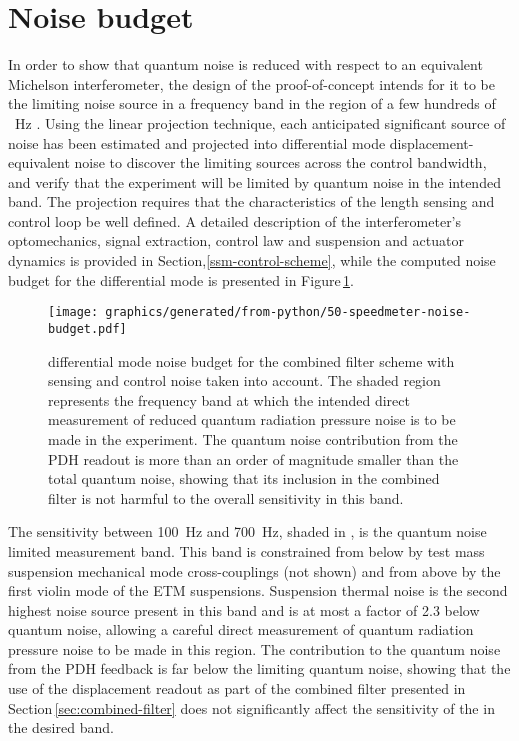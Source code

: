 \section{\label{sec:noise-budget}Noise budget}

In order to show that quantum noise is reduced with respect to an equivalent Michelson interferometer, the design of the proof-of-concept \SSM{} intends for it to be the limiting noise source in a frequency band in the region of a few hundreds of \SI{}{\hertz} \cite{Graef2014}. Using the linear projection technique, each anticipated significant source of noise has been estimated and projected into differential mode displacement-equivalent noise to discover the limiting sources across the control bandwidth, and verify that the experiment will be limited by quantum noise in the intended band. The projection requires that the characteristics of the length sensing and control loop be well defined. A detailed description of the interferometer's optomechanics, signal extraction, control law and suspension and actuator dynamics is provided in Section,\ref{ssm-control-scheme}, while the computed noise budget for the differential mode is presented in Figure\,\ref{fig:noise-budget}.

\begin{figure}
  \texttt{[image: graphics/generated/from-python/50-speedmeter-noise-budget.pdf]}
  \caption[Control noise budget for the \SSMEXPT{}]{\label{fig:noise-budget}\SSM{} differential mode noise budget for the combined filter scheme with sensing and control noise taken into account. The shaded region represents the frequency band at which the intended direct measurement of reduced quantum radiation pressure noise is to be made in the experiment. The quantum noise contribution from the PDH readout is more than an order of magnitude smaller than the total quantum noise, showing that its inclusion in the combined filter is not harmful to the overall sensitivity in this band.}
\end{figure}

The sensitivity between \SI{100}{\hertz} and \SI{700}{\hertz}, shaded in , is the quantum noise limited measurement band. This band is constrained from below by test mass suspension mechanical mode cross-couplings (not shown) and from above by the first violin mode of the ETM suspensions. Suspension thermal noise is the second highest noise source present in this band and is at most a factor of \SI{2.3}{} below quantum noise, allowing a careful direct measurement of quantum radiation pressure noise to be made in this region. The contribution to the quantum noise from the PDH feedback is far below the limiting quantum noise, showing that the use of the displacement readout as part of the combined filter presented in Section\,\ref{sec:combined-filter} does not significantly affect the sensitivity of the \SSM{} in the desired band.

